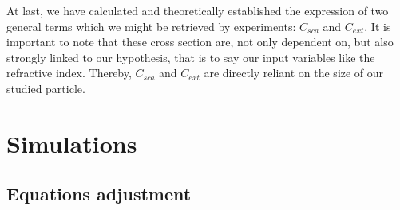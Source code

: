 \documentclass{article}
\numberwithin{equation}{section}
\begin{document}
At last, we have calculated and theoretically established the expression of two general terms which we might be retrieved by experiments: $C_{sca}$ and $C_{ext}$. It is important to note that these cross section are, not only dependent on, but also strongly linked to our hypothesis, that is to say our input variables like the refractive index. Thereby, $C_{sca}$ and $C_{ext}$ are directly reliant on the size of our studied particle.

\section{Simulations}

\subsection{Equations adjustment}
\end{document}
